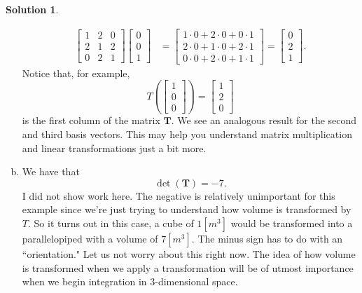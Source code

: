 \documentclass[12pt]{report} %
\theoremstyle{definition}
\newtheorem{solution}{Solution}
\begin{document}
\begin{solution}
\begin{enumerate}[(a)]
\begin{align*}
        \begin{bmatrix} 1 & 2 & 0\\ 2 & 1 & 2 \\ 0 & 2 & 1\end{bmatrix} \begin{bmatrix} 0 \\ 0\\ 1\end{bmatrix}&= \begin{bmatrix} 1\cdot 0 + 2 \cdot 0 + 0\cdot 1\\ 2\cdot 0 + 1 \cdot 0 + 2\cdot 1 \\ 0 \cdot 0 + 2 \cdot 0 + 1 \cdot 1\end{bmatrix} = \begin{bmatrix} 0 \\ 2 \\ 1\end{bmatrix}.
    \end{align*}
    Notice that, for example, 
    \[
    T\left( \begin{bmatrix} 1\\ 0 \\ 0 \end{bmatrix}\right)=\begin{bmatrix} 1 \\ 2 \\ 0\end{bmatrix}
    \]
    is the first column of the matrix $\mathbf{T}$.  We see an analogous result for the second and third basis vectors.  This may help you understand matrix multiplication and linear transformations just a bit more.
    
    \item We have that
    \[
    \det(\mathbf{T})=-7.
    \]
    I did not show work here.  The negative is relatively unimportant for this example since we're just trying to understand how volume is transformed by $T$.  So it turns out in this case, a cube of $1[m^3]$ would be transformed into a parallelopiped with a volume of $7[m^3]$. The minus sign has to do with an ``orientation." Let us not worry about this right now. The idea of how volume is transformed when we apply a transformation will be of utmost importance when we begin integration in 3-dimensional space.
\end{enumerate}
\end{solution}
\end{document}
